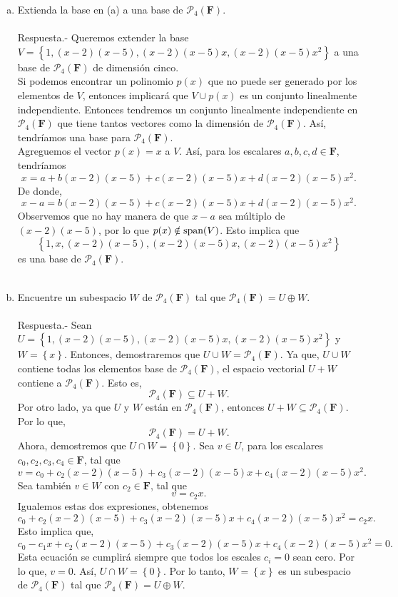 \begin{enumerate}[\bfseries 1.]
\begin{enumerate}[(a)]
	    \item Extienda la base en (a) a una base de $\mathcal{P}_4(\textbf{F})$.\\\\
		Respuesta.-\; Queremos extender la base $V=\left\{1,(x-2)(x-5),(x-2)(x-5)x,(x-2)(x-5)x^2\right\}$ a una base de $\mathcal{P}_4(\textbf{F})$ de dimensión cinco. \\
		Si podemos encontrar un polinomio $p(x)$ que no puede ser generado por los elementos de $V$, entonces implicará que $V\cup p(x)$ es un conjunto linealmente independiente. Entonces tendremos un conjunto linealmente independiente en $\mathcal{P}_4(\textbf{F})$ que tiene tantos vectores como la dimensión de $\mathcal{P}_4(\textbf{F})$. Así, tendríamos una base para $\mathcal{P}_4(\textbf{F})$.\\
		Agreguemos el vector $p(x)=x$ a $V$. Así, para los escalares $a,b,c,d\in \textbf{F}$, tendríamos
		$$x=a+b(x-2)(x-5)+c(x-2)(x-5)x+d(x-2)(x-5)x^2.$$
		De donde,
		$$x-a=b(x-2)(x-5)+c(x-2)(x-5)x+d(x-2)(x-5)x^2.$$
		Observemos que no hay manera de que $x-a$ sea múltiplo de $(x-2)(x-5)$, por lo que $p(x)\notin \mathop{\mbox{\normalfont span}}\nolimits(V)$. Esto implica que 
		$$\left\{1,x,(x-2)(x-5),(x-2)(x-5)x,(x-2)(x-5)x^2\right\}$$
		es una base de $\mathcal{P}_4(\textbf{F})$.\\\\


	    \item Encuentre un subespacio $W$ de $\mathcal{P}_4(\textbf{F})$ tal que $\mathcal{P}_4(\textbf{F})=U\oplus W$.\\\\
		Respuesta.-\; Sean $U=\left\{1,(x-2)(x-5),(x-2)(x-5)x,(x-2)(x-5)x^2\right\}$ y $W=\left\{x\right\}$. Entonces, demostraremos que $U\cup W=\mathcal{P}_4(\textbf{F})$. Ya que, $U\cup W$ contiene todas los elementos base de $\mathcal{P}_4(\textbf{F})$, el espacio vectorial $U+W$ contiene a $\mathcal{P}_4(\textbf{F})$. Esto es,
		$$\mathcal{P}_4(\textbf{F})\subseteq U+W.$$
		Por otro lado, ya que $U$ y $W$ están en $\mathcal{P}_4(\textbf{F})$, entonces $U+W\subseteq \mathcal{P}_4(\textbf{F})$. Por lo que, 
		$$\mathcal{P}_4(\textbf{F})=U+W.$$
		Ahora, demostremos que $U\cap W=\left\{0\right\}$. Sea $v\in U$, para los escalares $c_0,c_2,c_3,c_4\in \textbf{F}$, tal que
		$$v=c_0+c_2(x-2)(x-5)+c_3(x-2)(x-5)x+c_4(x-2)(x-5)x^2.$$
		Sea también $v\in W$  con $c_2\in \textbf{F}$, tal que
		$$v=c_2x.$$
		Igualemos estas dos expresiones, obtenemos
		$$c_0+c_2(x-2)(x-5)+c_3(x-2)(x-5)x+c_4(x-2)(x-5)x^2=c_2x.$$
		Esto implica que,
		$$c_0-c_1x+c_2(x-2)(x-5)+c_3(x-2)(x-5)x+c_4(x-2)(x-5)x^2=0.$$
		Esta ecuación se cumplirá siempre que todos los escales $c_i=0$ sean cero. Por lo que, $v=0$. Así, $U\cap W=\left\{0\right\}.$ Por lo tanto, $W=\left\{x\right\}$ es un subespacio de $\mathcal{P}_4(\textbf{F})$ tal que $\mathcal{P}_4(\textbf{F})=U\oplus W.$\\\\


\end{enumerate}
\end{enumerate}
